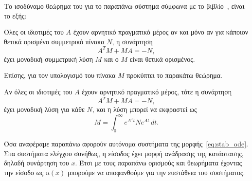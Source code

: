 Το ισοδύναμο θεώρημα του  για το παραπάνω σύστημα σύμφωνα
με το βιβλίο~\cite{chen1999linear}, είναι το εξής:
\begin{theorem} 
    Όλες οι ιδιοτιμές του \( A \) έχουν αρνητικό πραγματικό μέρος αν και μόνο αν
    για κάποιον θετικά ορισμένο συμμετρικό πίνακα \( N \), η συνάρτηση
    \[
        A^{T}M + MA = -N,
    \]
    έχει μοναδική συμμετρική λύση \( M \) και ο \( M \) είναι θετικά ορισμένος.
\end{theorem}
Επίσης, για τον υπολογισμό του πίνακα \( M \) προκύπτει το παρακάτω θεώρημα.
\begin{theorem} 
    Αν όλες οι ιδιοτιμές του \( A \) έχουν αρνητικό πραγματικό μέρος,
    τότε η συνάρτηση 
    \[
        A^{T}M + MA = -N,
    \]
    έχει μοναδική λύση για κάθε \( N \), και η λύση μπορεί να εκφραστεί ως
    \[
        M = \int_0^{\infty}e^{A^{T}t}Ne^{At} \, dt.
    \]
\end{theorem}

Όσα αναφέραμε παραπάνω αφορούν αυτόνομα συστήματα της
μορφής~\eqref{eq:stab_ode}. Στα συστήματα ελέγχου συνήθως, η είσοδος έχει
μορφή ανάδρασης της κατάστασης, δηλαδή συνάρτηση του \( x \). Έτσι με τους παραπάνω
ορισμούς και θεωρήματα έχοντας την είσοδο ως \( u(x) \) μπορούμε να αποφανθούμε
για την ευστάθεια του συστήματος.

